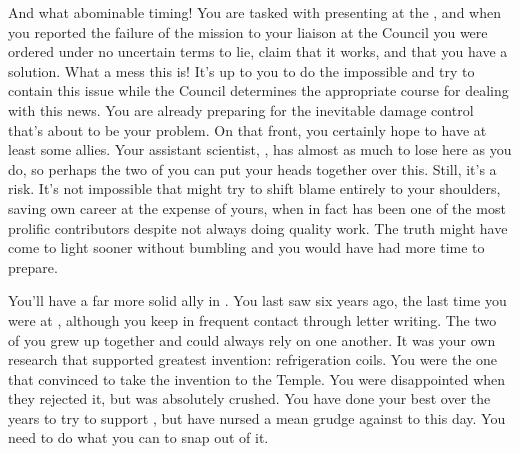 \documentclass[char]{GL2020}
\begin{document}
And what abominable timing!  You are tasked with presenting at the \pSchool{}, and when you reported the failure of the mission to your liaison at the Council you were ordered under no uncertain terms to lie, claim that it works, and that you have a solution. What a mess this is!  It’s up to you to do the impossible and try to contain this issue while the Council determines the appropriate course for dealing with this news. You are already preparing for the inevitable damage control that’s about to be your problem. On that front, you certainly hope to have at least some allies. Your assistant scientist, \cAssistantScientist{}, has almost as much to lose here as you do, so perhaps the two of you can put your heads together over this. Still, it’s a risk. It’s not impossible that \cAssistantScientist{\they} might try to shift blame entirely to your shoulders, saving \cAssistantScientist{\their} own career at the expense of yours, when in fact \cAssistantScientist{} has been one of the most prolific contributors despite not always doing quality work. The truth might have come to light sooner without \cAssistantScientist{\their} bumbling and you would have had more time to prepare.

You’ll have a far more solid ally in \cChupInventor{}. You last saw \cChupInventor{\them} six years ago, the last time you were at \pSc{}, although you keep in frequent contact through letter writing. The two of you grew up together and could always rely on one another. It was your own research that supported \cChupInventor{\their} greatest invention: refrigeration coils. You were the one that convinced \cChupInventor{} to take the invention to the Temple. You were disappointed when they rejected it, but \cChupInventor{} was absolutely crushed. You have done your best over the years to try to support \cChupInventor{}, but \cChupInventor{\they} have nursed a mean grudge against \cChupInventor{\plural} to this day. You need to do what you can to snap \cChupInventor{\them} out of it.
\end{document}
